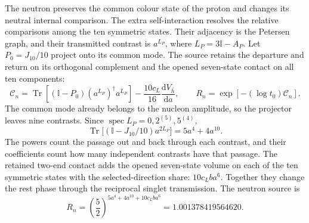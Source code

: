 \documentclass[aps,prx,onecolumn,10pt,notitlepage,nofootinbib,longbibliography]{revtex4-2}
\numberwithin{equation}{section}
\numberwithin{table}{section}
\newcommand{\Id}{\mathbb I}
\newcommand{\Tr}{\operatorname{Tr}}
\newcommand{\dd}{\mathrm d}
\begin{document}
The neutron preserves the common colour state of the proton and changes its neutral internal comparison. The extra self-interaction resolves the relative comparisons among the ten symmetric states. Their adjacency is the Petersen graph, and their transmitted contrast is $a^{L_P}$, where $L_P=3\Id-A_P$. Let $P_0=J_{10}/10$ project onto its common mode. The source retains the departure and return on its orthogonal complement and the opened seven-state contact on all ten components:
\begin{equation}
 \mathcal C_n=\Tr\!\left[(\Id-P_0)(a^{L_P})^\dagger a^{L_P}\right]
 -\frac{10c_L}{16}\frac{\dd V_{\bar h}}{\dd a},\qquad
 R_n=\exp[-(\log t_0)\mathcal C_n].
 \label{eq:neutronsourcefunctional}
\end{equation}
The common mode already belongs to the nucleon amplitude, so the projector leaves nine contrasts. Since $\operatorname{spec}L_P=0,2^{(5)},5^{(4)}$,
\begin{equation}
 \Tr\bigl[(\Id-J_{10}/10)a^{2L_P}\bigr]
 =5a^4+4a^{10}.
 \label{eq:neutroncontrasts}
\end{equation}
The powers count the passage out and back through each contrast, and their coefficients count how many independent contrasts have that passage. The retained two-end contact adds the opened seven-state volume on each of the ten symmetric states with the selected-direction share: $10c_Lba^6$. Together they change the rest phase through the reciprocal singlet transmission. The neutron source is
\begin{equation}
 R_n
 =\left(\frac52\right)^{5a^4+4a^{10}+10c_Lba^6}
 =1.001378419564620.
 \label{eq:neutron}
\end{equation}
\end{document}
